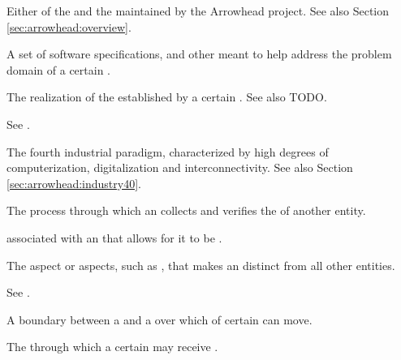 {
Either of the  and the  maintained by the Arrowhead project.
See also Section \ref{sec:arrowhead:overview}.

A set of software specifications,  and other  meant to help address the problem domain of a certain .

The realization of the  established by a certain .
See also TODO.

 See .

The fourth industrial paradigm, characterized by high degrees of computerization, digitalization and interconnectivity.
See also Section \ref{sec:arrowhead:industry40}.

The process through which an  collects and verifies the  of another entity. 

 associated with an  that allows for it to be .

The aspect or aspects, such as , that makes an  distinct from all other entities.

See .


A boundary between a  and a  over which  of certain  can move.

The  through which a certain  may receive .

}
